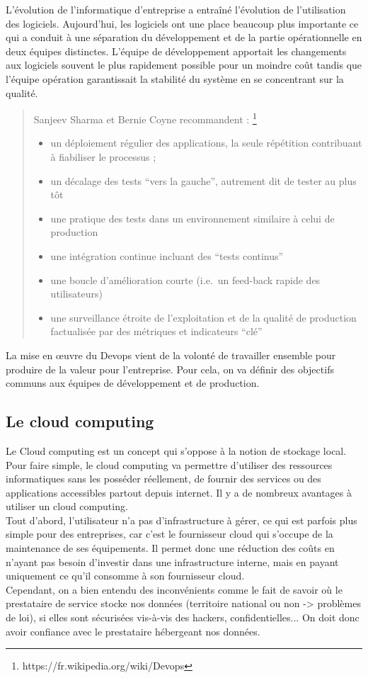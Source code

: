 \documentclass[]{article}
\begin{document}
L'évolution de l'informatique d'entreprise a entraîné l'évolution de
l'utilisation des logiciels. Aujourd'hui, les logiciels ont une place
beaucoup plus importante ce qui a conduit à une
séparation du développement et de la partie opérationnelle en deux
équipes distinctes. L'équipe de développement apportait les changements
aux logiciels souvent le plus rapidement possible pour un moindre coût
tandis que l'équipe opération garantissait la stabilité du système en se
concentrant sur la qualité.

\begin{quote}
Sanjeev Sharma et Bernie Coyne recommandent : \footnote{https://fr.wikipedia.org/wiki/Devops}
\begin{itemize}
\item un déploiement régulier
des applications, la seule répétition contribuant à fiabiliser le
processus ; 
\item  un décalage des tests ``vers la gauche'', autrement dit de
tester au plus tôt 
\item  une pratique des tests dans un environnement
similaire à celui de production 
\item  une intégration continue incluant des
``tests continus'' 
\item  une boucle d'amélioration courte (i.e.~un feed-back
rapide des utilisateurs) 
\item une surveillance étroite de l'exploitation et
de la qualité de production factualisée par des métriques et indicateurs
``clé''
\end{itemize}
\end{quote}

La mise en œuvre du Devops vient de la volonté de travailler ensemble
pour produire de la valeur pour l'entreprise. Pour cela, on va définir
des objectifs communs aux équipes de développement et de production.

\subsection{Le cloud computing}\label{le-cloud-computing}

Le Cloud computing est un concept qui s'oppose à la notion de stockage
local. Pour faire simple, le cloud computing va permettre d'utiliser des
ressources informatiques sans les posséder réellement, de fournir des
services ou des applications accessibles partout depuis internet. Il y a
de nombreux avantages à utiliser un cloud computing. \\
Tout d'abord, l'utilisateur n'a pas d'infrastructure à gérer, ce qui est parfois plus
simple pour des entreprises, car c'est le fournisseur cloud qui s'occupe
de la maintenance de ses équipements. Il permet donc une réduction des
coûts en n'ayant pas besoin d'investir dans une infrastructure interne,
mais en payant uniquement ce qu'il consomme à son fournisseur cloud.\\
Cependant, on a bien entendu des inconvénients comme le fait de savoir
où le prestataire de service stocke nos données (territoire national ou
non -\textgreater{} problèmes de loi), si elles sont sécurisées vis-à-vis des hackers, confidentielles...
On doit donc avoir confiance avec le prestataire hébergeant nos données.
\end{document}
